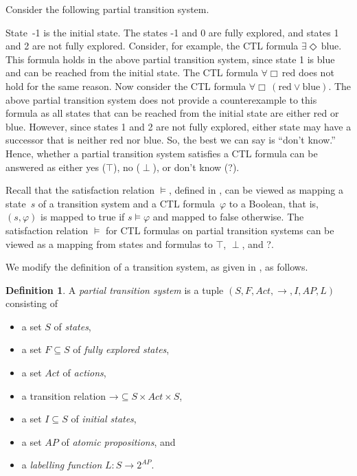 \documentclass[12pt]{article}
\newcommand{\always}{\Box}
\newcommand{\eventually}{\Diamond}
\theoremstyle{definition}
\newtheorem{definition}{Definition}
\begin{document}
Consider the following partial transition system.
\begin{center}
\end{center}
State~-1 is the initial state.  The states -1 and 0 are fully explored, and  states 1 and 2 are not fully explored.  Consider, for example, the CTL formula $\exists \eventually\, \mbox{blue}$.  This formula holds in the above partial transition system, since state 1 is blue and can be reached from the initial state.  The CTL formula $\forall \always\, \mbox{red}$ does not hold for the same reason.  Now consider the CTL formula $\forall \always\, (\mbox{red} \vee \mbox{blue})$.  The above partial transition system does not provide a counterexample to this formula as all states that can be reached from the initial state are either red or blue.  However, since states 1 and 2 are not fully explored, either state may have a successor that is neither red nor blue.  So, the best we can say is ``don't know.''  Hence, whether a partial transition system satisfies a CTL formula can be answered as either yes ($\top$), no ($\perp$), or don't know (?).

Recall that the satisfaction relation $\models$, defined in \cite[Definition~6.4]{BK08}, can be viewed as mapping a state~$s$ of a transition system and a CTL formula~$\varphi$ to a Boolean, that is, $(s, \varphi)$ is mapped to true if $s \models \varphi$ and mapped to false otherwise.  The satisfaction relation $\models$ for CTL formulas on partial transition systems can be viewed as a mapping from states and formulas to $\top$, $\perp$, and ?.

We modify the definition of a transition system, as given in \cite[Definition~2.1]{BK08}, as follows.

\begin{definition}
A \emph{partial transition system} is a tuple $(S, F, \mathit{Act}, \rightarrow, I, \mathit{AP}, L)$ consisting of
\begin{itemize}
\item 
a set $S$ of \emph{states},
\item
a set $F \subseteq S$ of \emph{fully explored states},
\item
a set $\mathit{Act}$ of \emph{actions},
\item
a transition relation $\mathord{\rightarrow} \subseteq S \times \mathit{Act} \times S$,
\item
a set $I \subseteq S$ of \emph{initial states},
\item
a set $\mathit{AP}$ of \emph{atomic propositions}, and
\item
a \emph{labelling function} $L : S \to 2^{\mathit{AP}}$.
\end{itemize}
\end{definition}
\end{document}
